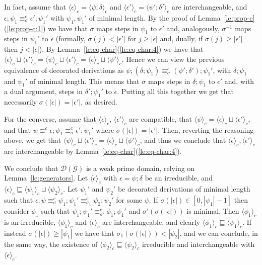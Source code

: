 \documentclass[conference]{IEEEtran}
\renewenvironment{proof}{\begin{IEEEproof}}{\end{IEEEproof}}
\newcommand{\zdom}[0]{\ensuremath{\mathcal{D}}}
\newcommand{\dom}[1]{\ensuremath{\zdom({#1})}}
\newcommand{\interval}[2][1]{\ensuremath{[{#1},{#2}]}}
\newcommand{\perm}{\sigma}
\newcommand{\ltrace}[1]{\ensuremath{\langle {#1}\rangle_c}}
\begin{document}
\begin{proof}
   In fact, assume that $\ltrace{\epsilon} = \ltrace{\psi; \delta}$
   and $\ltrace{\epsilon'} = \ltrace{\psi';\delta'}$ are
   interchangeable, and
   $\epsilon; \psi_1 \equiv^c_{\perm} \epsilon' ; \psi_1'$ with
   $\psi_1, \psi_1'$ of minimal length. By the proof of
   Lemma~\ref{le:prop-c}(\ref{le:prop-c:1})
   we have that $\perm$ maps steps in $\psi_1$ to
   $\epsilon'$ and, analogously, $\perm^{-1}$ maps steps in
   $\psi_1'$ to $\epsilon$ (formally, $\perm(j) < |\epsilon'|$ for $j
   \geq |\epsilon|$ and, dually, if $\perm(j) \geq
   |\epsilon'|$ then $j <
   |\epsilon|$). By Lemma~\ref{le:eq-char}(\ref{le:eq-char:4}) we have
   that $\ltrace{\epsilon} \sqcup \ltrace{\epsilon'} = \ltrace{\psi}
   \sqcup \ltrace{\epsilon'} = \ltrace{\epsilon} \sqcup
   \ltrace{\psi'}$. Hence we can view the previous equivalence of
   decorated derivations as $\psi; (\delta ; \psi_1) \equiv^c_{\perm}
   (\psi'; \delta') ;\psi_1'$, with $\delta ; \psi_1$ and
   $\psi_1'$ of minimal length. This means that
   $\perm$ maps steps in $\delta;\psi_1$ to
   $\epsilon'$ and, with a dual argument, steps in
   $\delta';\psi_1'$ to
   $\epsilon$. Putting all this together we get that necessarily
   $\perm(|\epsilon|) = |\epsilon'|$, as desired.

   For the converse, assume that
   $\ltrace{\epsilon}$,
   $\ltrace{\epsilon'}$ are compatible, that $\ltrace{\psi} =
   \ltrace{\epsilon} \sqcup \ltrace{\epsilon'}$, and that $\psi
   \equiv^c \epsilon; \psi_1 \equiv^c_{\perm} \epsilon' ;
   \psi_1'$ where $\perm(|\epsilon|) =
   |\epsilon'|$. Then, reverting the reasoning above, we get that
   $\ltrace{\psi} \sqcup \ltrace{\epsilon'} = \ltrace{\epsilon} \sqcup
   \ltrace{\psi'}$, and thus we conclude that $\ltrace{\epsilon},
   \ltrace{\epsilon'}$ are interchangeable by
   Lemma~\ref{le:eq-char}(\ref{le:eq-char:4}).


  \medskip


  We conclude that $\dom{\mathcal{G}}$ is a weak prime domain, relying on
  Lemma~\ref{le:generators}. Let $\ltrace{\epsilon}$ with
  $\epsilon = \psi; \delta$ be an irreducible, and
  $\ltrace{\epsilon} \sqsubseteq \ltrace{\psi_1} \sqcup
  \ltrace{\psi_2}$.
  Let $\psi_1'$ and $\psi_2'$ be decorated derivations of minimal
  length such that
  $\epsilon;\psi \equiv^c_\perm \psi_1;\psi_1' \equiv^c_{\perm_1}
  \psi_2;\psi_2'$ for some $\psi$. If
  $\perm(|\epsilon|) \in \interval[0]{|\psi_1|-1}$ then consider
  $\phi_1$ such that
  $\psi_1;\psi_1' \equiv^c_{\perm'} \phi_1; \psi_1'$ and
  $\perm'(\perm(|\epsilon|))$ is minimal. Then $\ltrace{\phi_1}$ is an
  irreducible, $\ltrace{\phi_1}$ and $\ltrace{\epsilon}$ are
  interchangeable, and clearly
  $\ltrace{\phi_1} \sqsubseteq \ltrace{\psi_1}$. If instead
  $\perm(|\epsilon|) \geq |\psi_1|$ we have that
  $\perm_1(\perm(|\epsilon|)) < |\psi_2|$, and we can conclude, in the
  same way, the existence of
  $\ltrace{\phi_2} \sqsubseteq {\ltrace{\psi_2}}$ irreducible and
  interchangeable with $\ltrace{\epsilon}$.
\end{proof}
\end{document}
